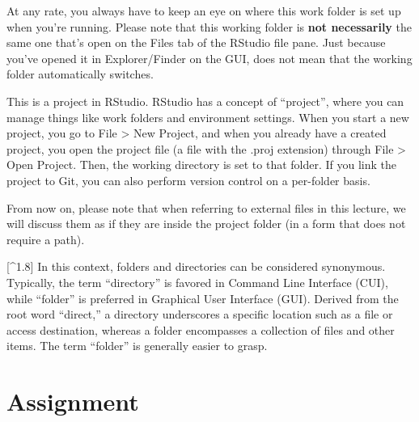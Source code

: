 \documentclass[
  a4paper,
]{book}
\begin{document}
At any rate, you always have to keep an eye on where this work folder is
set up when you're running. Please note that this working folder is
\textbf{not necessarily} the same one that's open on the Files tab of
the RStudio file pane. Just because you've opened it in Explorer/Finder
on the GUI, does not mean that the working folder automatically
switches.

This is a project in RStudio. RStudio has a concept of ``project'',
where you can manage things like work folders and environment settings.
When you start a new project, you go to File \textgreater{} New Project,
and when you already have a created project, you open the project file
(a file with the .proj extension) through File \textgreater{} Open
Project. Then, the working directory is set to that folder. If you link
the project to Git, you can also perform version control on a per-folder
basis.

From now on, please note that when referring to external files in this
lecture, we will discuss them as if they are inside the project folder
(in a form that does not require a path).

{[}\^{}1.8{]} In this context, folders and directories can be considered
synonymous. Typically, the term ``directory'' is favored in Command Line
Interface (CUI), while ``folder'' is preferred in Graphical User
Interface (GUI). Derived from the root word ``direct,'' a directory
underscores a specific location such as a file or access destination,
whereas a folder encompasses a collection of files and other items. The
term ``folder'' is generally easier to grasp.

\section{Assignment}\label{assignment}
\end{document}
